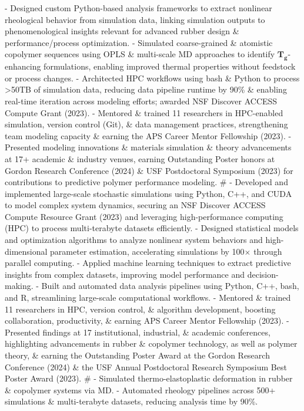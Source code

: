 - Designed custom Python-based analysis frameworks to extract nonlinear rheological behavior from simulation data, linking simulation outputs to phenomenological insights relevant for advanced rubber design \& performance/process optimization.
- Simulated coarse-grained \& atomistic copolymer sequences using OPLS \& multi-scale MD approaches to identify $\bm{T_g}$-enhancing formulations, enabling improved thermal properties without feedstock or process changes.
- Architected HPC workflows using bash \& Python to process >50TB of simulation data, reducing data pipeline runtime by 90\% \& enabling real-time iteration across modeling efforts; awarded NSF Discover ACCESS Compute Grant (2023).
- Mentored \& trained 11 researchers in HPC-enabled simulation, version control (Git), \& data management practices, strengthening team modeling capacity \& earning the APS Career Mentor Fellowship (2023).
- Presented modeling innovations \& materials simulation \& theory advancements at 17+ academic \& industry venues, earning Outstanding Poster honors at Gordon Research Conference (2024) \& USF Postdoctoral Symposium (2023) for contributions to predictive polymer performance modeling.
#
- Developed and implemented large-scale stochastic simulations using Python, C++, and CUDA to model complex system dynamics, securing an NSF Discover ACCESS Compute Resource Grant (2023) and leveraging high-performance computing (HPC) to process multi-terabyte datasets efficiently.
- Designed statistical models and optimization algorithms to analyze nonlinear system behaviors and high-dimensional parameter estimation, accelerating simulations by 100$\times$ through parallel computing.
- Applied machine learning techniques to extract predictive insights from complex datasets, improving model performance and decision-making.
- Built and automated data analysis pipelines using Python, C++, bash, and R, streamlining large-scale computational workflows.
- Mentored \& trained 11 researchers in HPC, version control, \& algorithm development, boosting collaboration, productivity, \& earning APS Career Mentor Fellowship (2023).
- Presented findings at 17 institutional, industrial, \& academic conferences, highlighting advancements in rubber \& copolymer technology, as well as polymer theory, \& earning the Outstanding Poster Award at the Gordon Research Conference (2024) \& the USF Annual Postdoctoral Research Symposium Best Poster Award (2023).
#
- Simulated thermo-elastoplastic deformation in rubber \& copolymer systems via MD.
- Automated rheology pipelines across 500+ simulations \& multi-terabyte datasets, reducing analysis time by 90\%.
